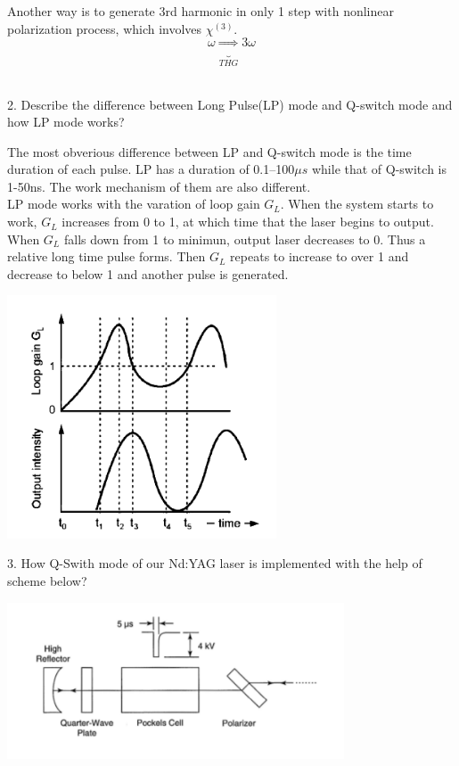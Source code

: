 \documentclass{article}
\begin{document}
Another way is to generate 3rd harmonic in only 1 step with nonlinear polarization process, which involves $\chi^{(3)}$.
\begin{equation*}
\omega \underbrace{\Longrightarrow}_{THG} 3\omega 
\end{equation*} \\
\par 
2. Describe the difference between Long Pulse(LP) mode and Q-switch mode and how LP mode works?\par 
The most obverious difference between LP and Q-switch mode is the time duration of each pulse. LP has a duration of 0.1--100$\mu s$ while that of Q-switch is 1-50ns. The work mechanism of them are also different.   \\
LP mode works with the varation of loop gain $G_L$. When the system starts to work, $G_L$ increases from 0 to 1, at which time that the laser begins to output. When  $G_L$ falls down from 1 to minimun, output laser decreases to 0. Thus a relative long time pulse forms.  Then  $G_L$ repeats to increase to over 1 and decrease to below 1 and another pulse is generated.
\begin{center}
\includegraphics[width=8cm]{pic1}
\end{center}
\par  
3. How Q-Swith mode of our Nd:YAG laser is implemented with the help of scheme below?
\begin{center}
\includegraphics[width=10cm]{pic2}
\end{center}
\end{document}
